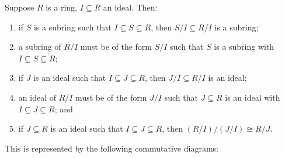 \begin{theorem}\label{thm:iso-3-ring}
    Suppose \(R\) is a ring, \(I \subseteq R\) an ideal. Then:
    \begin{enumerate}[label={(\alph*)}, itemsep=0mm]
        \item if \(S\) is a subring such that \(I \subseteq S \subseteq R\),
            then \(S/I \subseteq R/I\) is a subring;
        \item a subring of \(R/I\) must be of the form \(S/I\)
            such that \(S\) is a subring with \(I \subseteq S \subseteq R\);
        \item if \(J\) is an ideal such that \(I \subseteq J \subseteq R\),
            then \(J/I \subseteq R/I\) is an ideal;
        \item an ideal of \(R/I\) must be of the form \(J/I\)
            such that \(J \subseteq R\) is an ideal
            with \(I \subseteq J \subseteq R\); and
        \item if \(J \subseteq R\) is an ideal such that \(I \subseteq J \subseteq R\),
            then \((R/I)/(J/I) \cong R/J\).
    \end{enumerate}

    This is represented by the following commutative diagrams:
    \begin{center}
         \qquad
    \end{center}
\end{theorem}

